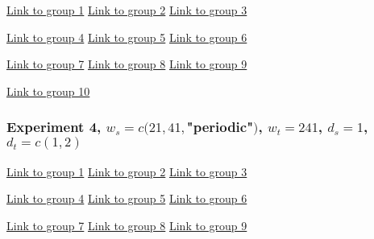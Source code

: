 \begin{framed}
\begin{center}
  \href{../plots/a1950/E3/QQ.error.tmax.group.1.pdf}{Link to group 1} 
  \;\;\;\;\;\;\;\;\;\;
  \href{../plots/a1950/E3/QQ.error.tmax.group.2.pdf}{Link to group 2} 
  \;\;\;\;\;\;\;\;\;\;
  \href{../plots/a1950/E3/QQ.error.tmax.group.3.pdf}{Link to group 3}
\end{center}
\begin{center}
  \href{../plots/a1950/E3/QQ.error.tmax.group.4.pdf}{Link to group 4} 
  \;\;\;\;\;\;\;\;\;\;
  \href{../plots/a1950/E3/QQ.error.tmax.group.5.pdf}{Link to group 5} 
  \;\;\;\;\;\;\;\;\;\;
  \href{../plots/a1950/E3/QQ.error.tmax.group.6.pdf}{Link to group 6}
\end{center}
\begin{center}
  \href{../plots/a1950/E3/QQ.error.tmax.group.7.pdf}{Link to group 7} 
  \;\;\;\;\;\;\;\;\;\;
  \href{../plots/a1950/E3/QQ.error.tmax.group.8.pdf}{Link to group 8} 
  \;\;\;\;\;\;\;\;\;\;
  \href{../plots/a1950/E3/QQ.error.tmax.group.9.pdf}{Link to group 9}
\end{center}
\begin{center}
  \href{../plots/a1950/E3/QQ.error.tmax.group.10.pdf}{Link to group 10}  
  \label{QQ.error.laggroup}
\end{center}
\end{framed}

\subsubsection{Experiment 4,  
\textmd{$w_s=c(21, 41, $"periodic"$)$, $w_t=241$, $d_s=1$, $d_t=c(1,2)$}
}

\begin{framed}
\begin{center}
  \href{../plots/a1950/E4/QQ.error.tmax.group.1.pdf}{Link to group 1} 
  \;\;\;\;\;\;\;\;\;\;
  \href{../plots/a1950/E4/QQ.error.tmax.group.2.pdf}{Link to group 2} 
  \;\;\;\;\;\;\;\;\;\;
  \href{../plots/a1950/E4/QQ.error.tmax.group.3.pdf}{Link to group 3}
\end{center}
\begin{center}
  \href{../plots/a1950/E4/QQ.error.tmax.group.4.pdf}{Link to group 4} 
  \;\;\;\;\;\;\;\;\;\;
  \href{../plots/a1950/E4/QQ.error.tmax.group.5.pdf}{Link to group 5} 
  \;\;\;\;\;\;\;\;\;\;
  \href{../plots/a1950/E4/QQ.error.tmax.group.6.pdf}{Link to group 6}
\end{center}
\begin{center}
  \href{../plots/a1950/E4/QQ.error.tmax.group.7.pdf}{Link to group 7} 
  \;\;\;\;\;\;\;\;\;\;
  \href{../plots/a1950/E4/QQ.error.tmax.group.8.pdf}{Link to group 8} 
  \;\;\;\;\;\;\;\;\;\;
  \href{../plots/a1950/E4/QQ.error.tmax.group.9.pdf}{Link to group 9}
  \label{QQ.error.laggroup}
\end{center}
\end{framed}

